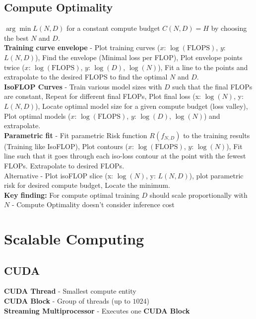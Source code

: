 \begin{multicols}{2}
\begin{mdframed}[style=eqbox]
        \subsection{Compute Optimality}
        $\arg\min L(N, D)$ for a constant compute budget $C(N, D) = H$ by choosing the best $N$ and $D$.\\
        \textbf{Training curve envelope} - Plot training curves ($x$: $\log(\mathrm{FLOPS})$, $y$: $L(N,D)$), Find the envelope (Minimal loss per FLOP), Plot envelope points twice ($x$: $\log(\mathrm{FLOPS})$, $y$: $\log(D)$, $\log(N)$), Fit a line to the points and extrapolate to the desired FLOPS to find the optimal $N$ and $D$.\\
        \textbf{IsoFLOP Curves} - Train various model sizes with $D$ such that the final FLOPs are constant, Repeat for different final FLOPs, Plot final loss (x: $\log(N)$, y: $L(N, D)$), Locate optimal model size for a given compute budget (loss valley), Plot optimal models ($x$: $\log(\mathrm{FLOPS})$, $y$: $\log(D)$, $\log(N)$) and extrapolate.\\
        \textbf{Parametric fit} - Fit parametric Risk function $R(f_{N,D})$ to the training results (Training like IsoFLOP), Plot contours ($x$: $\log(\mathrm{FLOPS})$, $y$: $\log(N)$), Fit line such that it goes through each iso-loss contour at the point with the fewest FLOPs. Extrapolate to desired FLOPs.\\
        Alternative - Plot isoFLOP slice (x: $\log(N)$, y: $L(N, D)$), plot parametric risk for desired compute budget, Locate the minimum.\\[0.5em]
        \textbf{Key finding:} For compute optimal training $D$ should scale proportionally with $N$ - Compute Optimality doesn't consider inference cost
    \end{mdframed}


    \section{Scalable Computing}
    \begin{mdframed}[style=eqbox]
        \subsection{CUDA}
        \textbf{CUDA Thread} - Smallest compute entity\\
        \textbf{CUDA Block} - Group of threads (up to $1024$)\\
        \textbf{Streaming Multiprocessor} - Executes one \textbf{CUDA Block}
    \end{mdframed}
    \begin{mdframed}[style=eqbox]

\end{mdframed}
\end{multicols}
